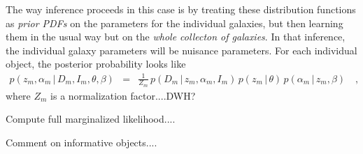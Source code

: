 \documentclass[12pt]{article}
\newcommand{\given}{\,|\,}
\begin{document}
The way inference proceeds in this case is by treating these
distribution functions as \emph{prior PDFs} on the parameters for the
individual galaxies, but then learning them in the usual way but on
the \emph{whole collecton of galaxies}.  In that inference, the
individual galaxy parameters will be nuisance parameters.  For each
individual object, the posterior probability looks like
\begin{eqnarray}\displaystyle
p(z_m, \alpha_m \given D_m, I_m, \theta, \beta) &=&
  \frac{1}{Z_m}\,p(D_m \given z_m, \alpha_m, I_m)
  \,p(z_m \given \theta)\,p(\alpha_m \given z_m, \beta)
\quad ,
\end{eqnarray}
where $Z_m$ is a normalization factor....DWH?

Compute full marginalized likelihood....

Comment on informative objects....
\end{document}
